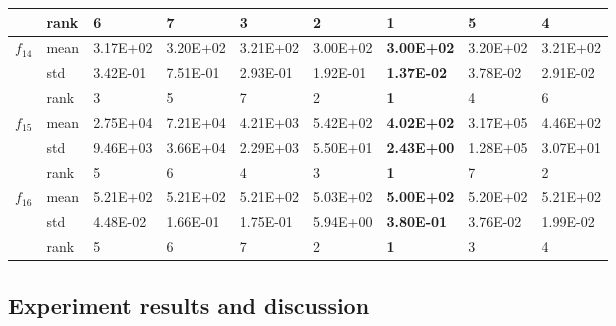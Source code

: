 \documentclass[a4paper,13pt,2p]{report}
\begin{document}
\begin{table}[!t]
{\begin{tabular}{|l|l|l|l|l|l|l|l|l|}
                     & rank & 6        & 7        & 3        & 2                 & \textbf{1}         & 5        & 4                 \\ \hline
\multirow{3}{*}{$f_{14}$} & mean & 3.17E+02 & 3.20E+02 & 3.21E+02 & 3.00E+02          & \textbf{3.00E+02}  & 3.20E+02 & 3.21E+02          \\ \cline{2-9} 
                     & std  & 3.42E-01 & 7.51E-01 & 2.93E-01 & 1.92E-01          & \textbf{1.37E-02}  & 3.78E-02 & 2.91E-02          \\ \cline{2-9} 
                     & rank & 3        & 5        & 7        & 2                 & \textbf{1}         & 4        & 6                 \\ \hline
\multirow{3}{*}{$f_{15}$} & mean & 2.75E+04 & 7.21E+04 & 4.21E+03 & 5.42E+02          & \textbf{4.02E+02}  & 3.17E+05 & 4.46E+02          \\ \cline{2-9} 
                     & std  & 9.46E+03 & 3.66E+04 & 2.29E+03 & 5.50E+01          & \textbf{2.43E+00}  & 1.28E+05 & 3.07E+01          \\ \cline{2-9} 
                     & rank & 5        & 6        & 4        & 3                 & \textbf{1}         & 7        & 2                 \\ \hline
\multirow{3}{*}{$f_{16}$} & mean & 5.21E+02 & 5.21E+02 & 5.21E+02 & 5.03E+02          & \textbf{5.00E+02}  & 5.20E+02 & 5.21E+02          \\ \cline{2-9} 
                     & std  & 4.48E-02 & 1.66E-01 & 1.75E-01 & 5.94E+00          & \textbf{3.80E-01}  & 3.76E-02 & 1.99E-02          \\ \cline{2-9} 
                     & rank & 5        & 6        & 7        & 2                 & \textbf{1}         & 3        & 4                 \\ \hline
\end{tabular}%
}
\end{table}
	
\subsection{Experiment results and discussion}
\label{exp_results}
\end{document}
